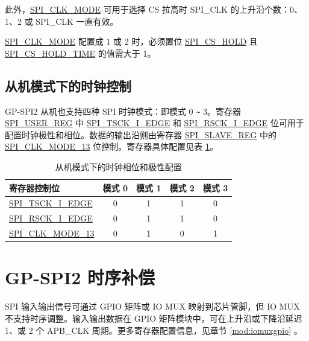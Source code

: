 \documentclass[main\_\_CN.tex]{subfiles}
\begin{document}
此外，\hyperref[fielddesc:SPICLKMODE]{SPI\_CLK\_MODE} 可用于选择 CS 拉高时 SPI\_CLK 的上升沿个数：0、1、2 或 SPI\_CLK 一直有效。

\begin{tiplisting}
 \hyperref[fielddesc:SPICLKMODE]{SPI\_CLK\_MODE} 配置成 1 或 2 时，必须置位 \hyperref[fielddesc:SPICSHOLD]{SPI\_CS\_HOLD} 且 \hyperref[fielddesc:SPICSHOLDTIME]{SPI\_CS\_HOLD\_TIME} 的值需大于 1。
\end{tiplisting}
\vspace{-1em}

\subsection{从机模式下的时钟控制}\label{GP-SPI2 slave clock control}

GP-SPI2 从机也支持四种 SPI 时钟模式：即模式 0 \verb+~+ 3。寄存器 \hyperref[regdesc:SPIUSERREG]{SPI\_USER\_REG} 中 \hyperref[fielddesc:SPITSCKIEDGE]{SPI\_TSCK\_I\_EDGE} 和 \hyperref[fielddesc:SPIRSCKIEDGE]{SPI\_RSCK\_I\_EDGE} 位可用于配置时钟极性和相位。数据的输出沿则由寄存器 \hyperref[regdesc:SPISLAVEREG]{SPI\_SLAVE\_REG} 中的 \hyperref[fielddesc:SPICLKMODE13]{SPI\_CLK\_MODE\_13} 位控制。寄存器具体配置见表  \ref{table:clock_pol_slave}。

\begin{table}[H]
    \centering
    \caption{从机模式下的时钟相位和极性配置}
    \label{table:clock_pol_slave}
    \begin{tabular}[c]{|p{3.5cm}|c|c|c|c|}
    \hline
    \rowcolor{lightgray}
    寄存器控制位 & 模式 0 & 模式 1 & 模式 2 & 模式 3\\
    \hline
   \hyperref[fielddesc:SPITSCKIEDGE]{SPI\_TSCK\_I\_EDGE}   & 0 & 1 & 1 & 0\\
    \hline
   \hyperref[fielddesc:SPIRSCKIEDGE]{SPI\_RSCK\_I\_EDGE}   & 0 & 1 & 1 & 0\\
    \hline
   \hyperref[fielddesc:SPICLKMODE13]{SPI\_CLK\_MODE\_13}     & 0 & 1 & 0 & 1\\
    \hline
    \end{tabular}
\end{table}


\section{GP-SPI2 时序补偿} \label{sec:gp-spi-timing-compensation}

SPI 输入输出信号可通过 GPIO 矩阵或 IO MUX 映射到芯片管脚，但 IO MUX 不支持时序调整。输入输出数据在 GPIO 矩阵模块中，可在上升沿或下降沿延迟 1、或 2 个 APB\_CLK 周期。更多寄存器配置信息，见章节 \ref{mod:iomuxgpio} \textit{}。
\end{document}
